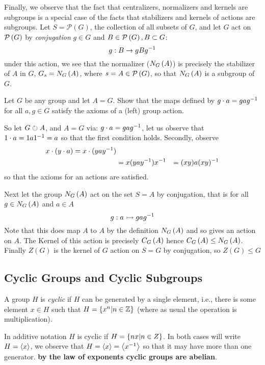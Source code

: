 Finally, we observe that the fact that centralizers, normalizers and kernels are subgroups is a special case of the facts that stabilizers and kernels of actions are subgroups. Let $ S = \mathcal{P}(G) $, the collection of all subsets of $ G $, and let $ G $ act on $ \mathcal{P}\left( G \right) $ by \emph{conjugation} $ g \in G $ and $ B \in \mathcal{P}\left( G \right), B \subset G $:
\[ g: B \rightarrow gBg^{-1} \]
under this action, we see that the normalizer ($ N_{G}\left( A \right) $) is precisely the stabilizer of $ A $ in $ G $, $ G_s = N_{G}\left( A \right) $, where $ s = A \in \mathcal{P}\left( G \right) $, so that $ N_{G}\left( A \right) $ is a subgroup of $ G $.
\begin{exc}
	Let $ G $ be any group and let $ A = G $. Show that the maps defined by $ g \cdot a = gag^{-1} $ for all $ a,g \in G $ satisfy the axioms of a (left) group action.
\end{exc}
\begin{sol}
	So let $ G \circlearrowright A $, and $ A = G $ via: $ g \cdot a = gag^{-1} $, let us observe that $ 1 \cdot a = 1a1^{-1} = a $ so that the first condition holds. Secondly, observe 
	\begin{align*}
	 x \cdot ( y\cdot a) = x \cdot (yay^{-1})  \\
	 &= x(yay^{-1})x^{-1}
	 &= (xy)a(xy)^{-1}
	\end{align*}
	so that the axioms for an actions are satisfied.
\end{sol}
Next let the group $ N_{G}\left( A \right) $ act on the set $ S = A $ by conjugation, that is for all $ g \in N_{G}\left( A \right) $ and $ a \in A $
\[ g: a \rightarrowtail gag^{-1} \]
Note that this does map $ A $ to $ A $ by the definition $ N_{G}\left( A \right) $ and so gives an action on $ A $. The Kernel of this action is precisely $ C_{G}\left( A \right) $ hence $ C_{G}\left( A \right) \leq N_{G}\left( A \right) $. Finally $ Z(G) $ is the kernel of $ G $ action on $ S = G $ by conjugation, so $ Z(G) \leq G $

\subsection{Cyclic Groups and Cyclic Subgroups}

\begin{defn}
	A group $ H $ is \emph{cyclic} if $ H $ can be generated by a single element, i.e., there is some element $ x \in H $ such that $ H = \left\lbrace x^n | n \in \mathbb{Z} \right\rbrace $ (where as usual the operation is multiplication).
\end{defn}
In additive notation $ H $ is cyclic if $ H = \left\lbrace nx | n \in Z \right\rbrace $. In both cases will write $ H = \left\langle x \right\rangle $, we observe that $ H = \left\langle x \right\rangle = \left\langle x^{-1} \right\rangle $ so that it may have more than one generator. \textbf{by the law of exponents cyclic groups are abelian}.

